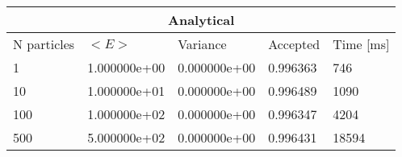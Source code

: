 \begin{tabular}{|l|l|l|l|l|}
\hline 
\multicolumn{5}{|c|}{Analytical}\\ 
\hline 
N particles & $<E>$ & Variance & Accepted & Time [ms]\\ 
 \hline 
1 & 1.000000e+00 & 0.000000e+00 & 0.996363 & 746 \\ 
\hline10 & 1.000000e+01 & 0.000000e+00 & 0.996489 & 1090 \\ 
\hline100 & 1.000000e+02 & 0.000000e+00 & 0.996347 & 4204 \\ 
\hline500 & 5.000000e+02 & 0.000000e+00 & 0.996431 & 18594 \\ 
\hline\end{tabular}